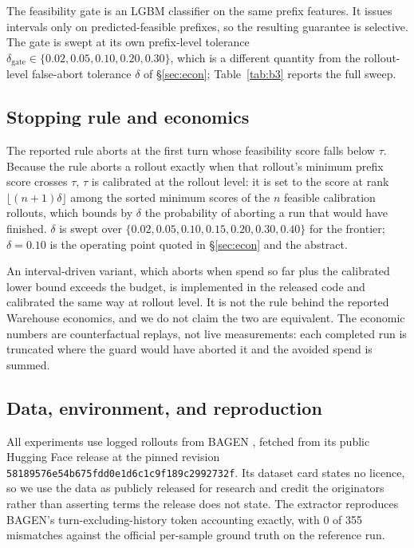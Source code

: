 \documentclass{article}
\begin{document}
The feasibility gate is an LGBM classifier on the same prefix features. It issues
intervals only on predicted-feasible prefixes, so the resulting guarantee is selective.
The gate is swept at its own prefix-level tolerance $\delta_{\mathrm{gate}} \in
\{0.02, 0.05, 0.10, 0.20, 0.30\}$, which is a different quantity from the rollout-level
false-abort tolerance $\delta$ of \S\ref{sec:econ}; Table~\ref{tab:b3} reports the full
sweep.

\subsection{Stopping rule and economics}
\label{app:stopping}

The reported rule aborts at the first turn whose feasibility score falls below $\tau$.
Because the rule aborts a rollout exactly when that rollout's minimum prefix score
crosses $\tau$, $\tau$ is calibrated at the rollout level: it is set to the score at
rank $\lfloor (n+1)\delta \rfloor$ among the sorted minimum scores of the $n$ feasible
calibration rollouts, which bounds by $\delta$ the probability of aborting a run that
would have finished. $\delta$ is swept over $\{0.02, 0.05, 0.10, 0.15, 0.20, 0.30,
0.40\}$ for the frontier; $\delta{=}0.10$ is the operating point quoted in
\S\ref{sec:econ} and the abstract.

An interval-driven variant, which aborts when spend so far plus the calibrated lower
bound exceeds the budget, is implemented in the released code and calibrated the same
way at rollout level. It is not the rule behind the reported Warehouse economics, and
we do not claim the two are equivalent. The economic numbers are counterfactual
replays, not live measurements: each completed run is truncated where the guard would
have aborted it and the avoided spend is summed.

\subsection{Data, environment, and reproduction}
\label{app:repro}

All experiments use logged rollouts from BAGEN \cite{lin2026bagen}, fetched from its
public Hugging Face release at the pinned revision
\texttt{58189576e54b675fdd0e1d6c1c9f189c2992732f}. Its dataset card states no licence,
so we use the data as publicly released for research and credit the originators rather
than asserting terms the release does not state. The extractor reproduces BAGEN's
turn-excluding-history token accounting exactly, with 0 of 355 mismatches against the
official per-sample ground truth on the reference run.
\end{document}
